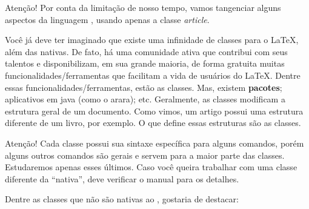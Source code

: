 \begin{atencao}{Atenção!}{\exclamacao}
  Por conta da limitação de nosso tempo, vamos tangenciar alguns aspectos da 
  linguagem , usando apenas a classe \textit{article}.
\end{atencao}

Você já deve ter imaginado que existe uma infinidade de \textsf{classes} para o
\LaTeX, além das nativas.
De fato, há uma comunidade ativa que contribui com seus talentos e disponibilizam,
em sua grande maioria, de forma gratuita muitas funcionalidades/ferramentas que 
facilitam a vida de usuários do \LaTeX.
Dentre essas funcionalidades/ferramentas, estão as \textsf{classes}.
Mas, existem \textbf{pacotes}; aplicativos em java (como o \textsf{arara}); etc.
Geralmente, as \textsf{classes} modificam a estrutura geral de um documento.
Como vimos, um \textsf{artigo} possui uma estrutura diferente de um \textsf{livro},
por exemplo.
O que define essas estruturas são as \textsf{classes}.

\begin{atencao}{Atenção!}{\exclamacao}
  Cada classe possui sua sintaxe específica para alguns comandos, porém alguns 
  outros comandos são gerais e servem para a maior parte das classes. 
  Estudaremos apenas esses últimos.
  Caso você queira trabalhar com uma classe diferente da “nativa”, deve 
  verificar o manual para os detalhes.
\end{atencao}

Dentre as classes que não são nativas ao , gostaria de destacar:

